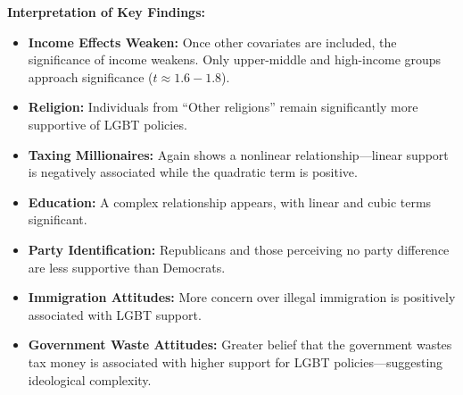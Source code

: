 \documentclass{article}
\begin{document}
\noindent
\textbf{Interpretation of Key Findings:}
\begin{itemize}
  \item \textbf{Income Effects Weaken:} Once other covariates are included, the significance of income weakens. Only upper-middle and high-income groups approach significance (\( t \approx 1.6{-}1.8 \)).
  \item \textbf{Religion:} Individuals from ``Other religions'' remain significantly more supportive of LGBT policies.
  \item \textbf{Taxing Millionaires:} Again shows a nonlinear relationship—linear support is negatively associated while the quadratic term is positive.
  \item \textbf{Education:} A complex relationship appears, with linear and cubic terms significant.
  \item \textbf{Party Identification:} Republicans and those perceiving no party difference are less supportive than Democrats.
  \item \textbf{Immigration Attitudes:} More concern over illegal immigration is positively associated with LGBT support.
  \item \textbf{Government Waste Attitudes:} Greater belief that the government wastes tax money is associated with higher support for LGBT policies—suggesting ideological complexity.
\end{itemize}
\end{document}
